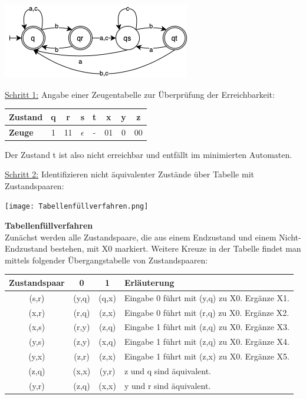 \begin{teile}
	\includegraphics[scale=0.8]{Komplement-DEA}
		
	\item
	\underline{Schritt 1:} Angabe einer Zeugentabelle zur Überprüfung der Erreichbarkeit:

	\begin{tabular}{l|ccccccc}
		\textbf{Zustand} & q & r  & s          & t & x  & y & z \\
		\hline
		\textbf{Zeuge}   & 1 & 11 & $\epsilon$ & - & 01 & 0 & 00 \\
	\end{tabular} 
	
	Der Zustand t ist also nicht erreichbar und entfällt im minimierten Automaten.
	
	\underline{Schritt 2:} Identifizieren nicht äquivalenter Zustände über Tabelle mit Zustandspaaren:
	
	\texttt{[image: Tabellenfüllverfahren.png]}

	\textbf{Tabellenfüllverfahren} \\
	Zunächst werden alle Zustandspaare, die aus einem Endzustand und einem Nicht-Endzustand bestehen, mit X0 markiert. Weitere Kreuze in der Tabelle findet man mittels folgender Übergangstabelle von Zustandspaaren:

	\begin{tabular}{c|c|c|l}
		\textbf{Zustandspaar} & \textbf{0} & \textbf{1} & \textbf{Erläuterung} \\
		\hline
		(s,r)                 & (y,q)      & (q,x)      & Eingabe 0 führt mit (y,q) zu X0. Ergänze X1. \\
		\hline
		(x,r)                 & (r,q)      & (z,x)      & Eingabe 0 führt mit (r,q) zu X0. Ergänze X2. \\
		\hline
		(x,s)                 & (r,y)      & (z,q)      & Eingabe 1 führt mit (z,q) zu X0. Ergänze X3. \\
		\hline
		(y,s)                 & (z,y)      & (x,q)      & Eingabe 1 führt mit (z,q) zu X0. Ergänze X4. \\
		\hline
		(y,x)                 & (z,r)      & (z,x)      & Eingabe 1 führt mit (z,x) zu X0. Ergänze X5. \\
		\hline
		(z,q)                 & (x,x)      & (y,r)      & z und q sind äquivalent. \\
		\hline 		
		(y,r)                 & (z,q)      & (x,x)      & y und r sind äquivalent. \\
	\end{tabular} 
	

\end{teile}
